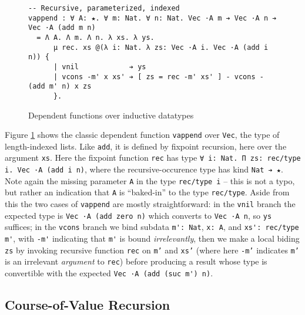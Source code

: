 \documentclass{article}
\begin{document}
\begin{figure}[h]
\begin{verbatim}
-- Recursive, parameterized, indexed
vappend : ∀ A: ★. ∀ m: Nat. ∀ n: Nat. Vec ·A m ➔ Vec ·A n ➔ Vec ·A (add m n)
  = Λ A. Λ m. Λ n. λ xs. λ ys.
      μ rec. xs @(λ i: Nat. λ zs: Vec ·A i. Vec ·A (add i n)) {
      | vnil            ➔ ys
      | vcons -m' x xs' ➔ [ zs = rec -m' xs' ] - vcons -(add m' n) x zs
      }.
\end{verbatim}
  \caption{Dependent functions over inductive datatypes}
  \label{fig:ex-data-dep}
\end{figure}

Figure \ref{fig:ex-data-dep} shows the classic dependent function
\texttt{vappend} over \texttt{Vec}, the type of length-indexed lists. Like
\texttt{add}, it is defined by fixpoint recursion, here over the argument
\texttt{xs}. Here the fixpoint function \texttt{rec} has type
\texttt{∀ i: Nat. Π zs: rec/type i. Vec ·A (add i n)}, where the
recursive-occurence type has kind \texttt{Nat ➔ ★}. Note again the missing parameter
\texttt{A} in the type \texttt{rec/type i} -- this is not a typo, but rather an
indication that \texttt{A} is ``baked-in'' to the type \texttt{rec/type}. Aside
from this the two cases of \texttt{vappend} are mostly straightforward: in the
\texttt{vnil} branch the expected type is \verb;Vec ·A (add zero n); which
converts to \verb;Vec ·A n;, so \texttt{ys} suffices; in the \texttt{vcons}
branch we bind subdata \verb;m': Nat;, \verb;x: A;, and \verb;xs': rec/type m';,
with \verb;-m'; indicating that \verb;m'; is bound \textit{irrelevantly}, then
we make a local biding \texttt{zs} by invoking recursive function \texttt{rec} on
\texttt{m'} and \texttt{xs'} (where here \texttt{-m'} indicates \texttt{m'}
is an irrelevant \textit{argument} to \texttt{rec}) before producing a result
whose type is convertible with the expected \verb;Vec ·A (add (suc m') n);.

\subsection{Course-of-Value Recursion}
\label{sec:intro-cov}
\end{document}
